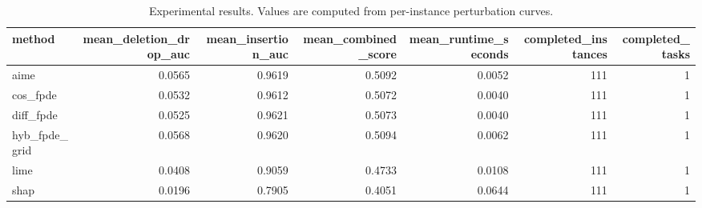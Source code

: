 \begin{table}[t]
\caption{Experimental results. Values are computed from per-instance perturbation curves.}
\label{tab:main_results_computed}
\centering
\begin{tabular}{lrrrrrr}
\toprule
method & mean\_deletion\_drop\_auc & mean\_insertion\_auc & mean\_combined\_score & mean\_runtime\_seconds & completed\_instances & completed\_tasks \\
\midrule
aime & 0.0565 & 0.9619 & 0.5092 & 0.0052 & 111 & 1 \\
cos\_fpde & 0.0532 & 0.9612 & 0.5072 & 0.0040 & 111 & 1 \\
diff\_fpde & 0.0525 & 0.9621 & 0.5073 & 0.0040 & 111 & 1 \\
hyb\_fpde\_grid & 0.0568 & 0.9620 & 0.5094 & 0.0062 & 111 & 1 \\
lime & 0.0408 & 0.9059 & 0.4733 & 0.0108 & 111 & 1 \\
shap & 0.0196 & 0.7905 & 0.4051 & 0.0644 & 111 & 1 \\
\bottomrule
\end{tabular}

\end{table}
